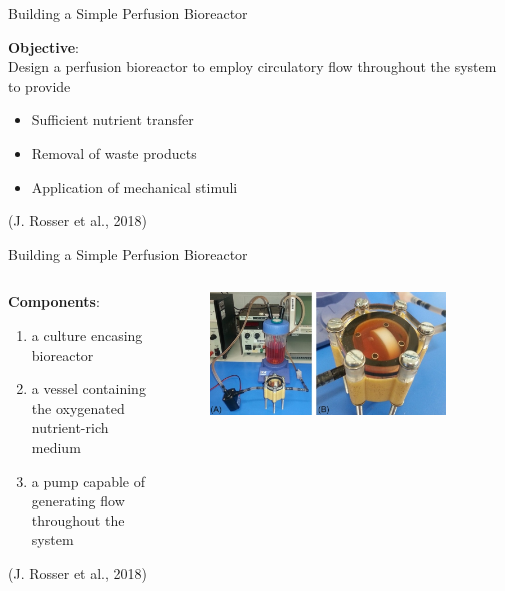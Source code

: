 \documentclass[11pt,t]{beamer}
\begin{document}
\begin{frame}[fragile]{Building a Simple Perfusion Bioreactor}

\textbf{Objective}:\\Design a perfusion bioreactor to employ circulatory flow throughout the system to provide
\begin{itemize}
\item
Sufficient nutrient transfer
\item
Removal of waste products
\item
Application of mechanical stimuli
\end{itemize}
	


\vfill
\footnotesize(J. Rosser et al., 2018)
		
\end{frame}


\begin{frame}[fragile]{Building a Simple Perfusion Bioreactor}  

	\begin{columns}[t]
		\begin{column}{.40\textwidth}
		\textbf{Components}:
		\begin{enumerate}
		\item
		a culture encasing bioreactor
		\item
		a vessel containing the oxygenated nutrient-rich medium 
		\item
		a pump capable of generating
flow throughout the system

		\end{enumerate}
		
		\vspace{10pt}
		\footnotesize(J. Rosser et al., 2018)
 
		\end{column}
		\begin{column}{.60\textwidth}
			\begin{figure}
			\centering
			\includegraphics[width=0.9\textwidth]{design}
			
			\end{figure}
		\end{column}
	\end{columns}	
		
\end{frame}
\end{document}
